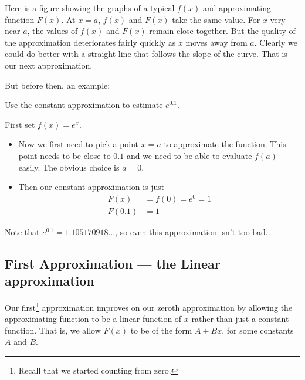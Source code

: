 Here is a figure showing the graphs of a typical $f(x)$ and approximating
function $F(x)$.
At $x=a$, $f(x)$ and $F(x)$ take the same value. For $x$ very near $a$,
the values of $f(x)$ and $F(x)$ remain close together. But the quality
of the approximation deteriorates fairly quickly as $x$ moves
away from $a$. Clearly we could do better with a straight line that follows the slope of
the curve. That is our next approximation.

But before then, an example:
\begin{eg}\label{eg ex const approx}
 Use the constant approximation to estimate $e^{0.1}$.

\soln First set $f(x) = e^x$.
\begin{itemize}
 \item Now we first need to pick a point $x=a$  to approximate the function. This point
needs to be close to $0.1$ and we need to be able to evaluate $f(a)$ easily. The obvious
choice is $a=0$.
\item Then our constant approximation is just
\begin{align*}
  F(x) &= f(0) = e^0 = 1\\
  F(0.1) &= 1
\end{align*}
\end{itemize}
Note that $e^{0.1} = 1.105170918\dots$, so even this approximation isn't too bad..
\end{eg}






\subsection{First Approximation --- the Linear approximation}
Our first\footnote{Recall that we started counting from
zero.} approximation improves on our zeroth approximation by allowing the approximating
function to be a linear function of $x$ rather than just a constant function. That is, we
allow $F(x)$ to be of the form $A+Bx$, for some constants $A$ and $B$.


